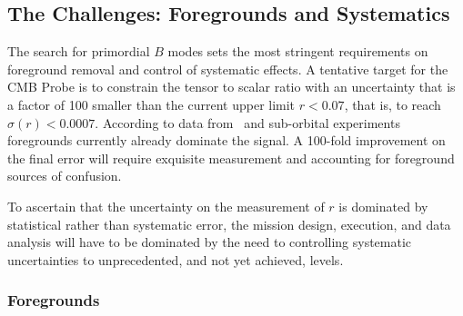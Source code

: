 \subsection{The Challenges: Foregrounds and Systematics}
\label{sec:foregrounds_systematics}

\vspace{-0.05in}
The search for primordial $B$ modes sets the most stringent requirements on foreground removal and control of systematic effects. A tentative target for the CMB Probe is to constrain the tensor to scalar ratio with an 
uncertainty that is a factor of 100 smaller than the current upper limit \mbox{$r < 0.07$}, that is, to reach 
$\sigma(r) <0.0007$. According to data from \planck\ and 
sub-orbital experiments foregrounds currently already dominate the signal. A 100-fold improvement 
on the final error will require exquisite measurement and accounting for foreground sources 
of confusion. 

To ascertain that the uncertainty on the measurement of $r$ is dominated by statistical rather than 
systematic error, the mission design, execution, and data analysis will have to be dominated by the need
to controlling systematic uncertainties to unprecedented, and not yet achieved, levels. 

\vspace{-0.18in}

\subsubsection{Foregrounds}
\label{sec:foregrounds}

\vspace{-0.05in}


